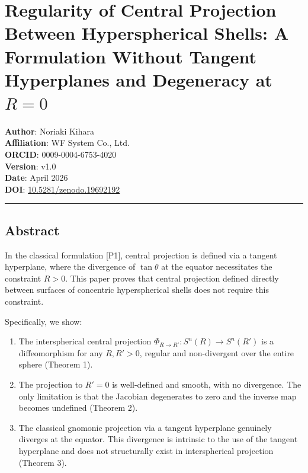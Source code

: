 \documentclass[
  a4paper]{article}
\author{}
\date{}
\providecommand{\tightlist}{%
  \setlength{\itemsep}{0pt}\setlength{\parskip}{0pt}}
\begin{document}
\section{\texorpdfstring{Regularity of Central Projection Between
Hyperspherical Shells: A Formulation Without Tangent Hyperplanes and
Degeneracy at
\(R = 0\)}{Regularity of Central Projection Between Hyperspherical Shells: A Formulation Without Tangent Hyperplanes and Degeneracy at R = 0}}\label{regularity-of-central-projection-between-hyperspherical-shells-a-formulation-without-tangent-hyperplanes-and-degeneracy-at-r-0}

\textbf{Author}: Noriaki Kihara\\
\textbf{Affiliation}: WF System Co., Ltd.\\
\textbf{ORCID}: 0009-0004-6753-4020\\
\textbf{Version}: v1.0\\
\textbf{Date}: April 2026\\
\textbf{DOI}:
\href{https://doi.org/10.5281/zenodo.19692192}{10.5281/zenodo.19692192}

\begin{center}\rule{0.5\linewidth}{0.5pt}\end{center}

\subsection{Abstract}\label{abstract}

In the classical formulation {[}P1{]}, central projection is defined via
a tangent hyperplane, where the divergence of \(\tan\theta\) at the
equator necessitates the constraint \(R > 0\). This paper proves that
central projection defined directly between surfaces of concentric
hyperspherical shells does not require this constraint.

Specifically, we show:

\begin{enumerate}
\def\labelenumi{\arabic{enumi}.}
\tightlist
\item
  The interspherical central projection
  \(\Phi_{R \to R'} : S^n(R) \to S^n(R')\) is a diffeomorphism for any
  \(R, R' > 0\), regular and non-divergent over the entire sphere
  (Theorem 1).
\item
  The projection to \(R' = 0\) is well-defined and smooth, with no
  divergence. The only limitation is that the Jacobian degenerates to
  zero and the inverse map becomes undefined (Theorem 2).
\item
  The classical gnomonic projection via a tangent hyperplane genuinely
  diverges at the equator. This divergence is intrinsic to the use of
  the tangent hyperplane and does not structurally exist in
  interspherical projection (Theorem 3).
\end{enumerate}
\end{document}
